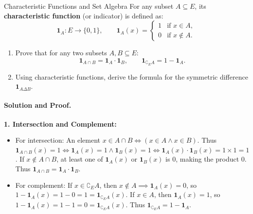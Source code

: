 \begin{workedexample}{Characteristic Functions and Set Algebra}
For any subset $A \subseteq E$, its \textbf{characteristic function} (or indicator) is defined as:
\[
\mathbf{1}_A : E \longrightarrow \{0, 1\}, \qquad \mathbf{1}_A(x) = \begin{cases} 1 & \text{if } x \in A, \\ 0 & \text{if } x \notin A. \end{cases}
\]
\begin{enumerate}[leftmargin=1.4em,itemsep=2pt]
  \item Prove that for any two subsets $A, B \subseteq E$:
  \[
  \mathbf{1}_{A \cap B} = \mathbf{1}_A \cdot \mathbf{1}_B, \qquad \mathbf{1}_{\complement_E A} = 1 - \mathbf{1}_A.
  \]
  \item Using characteristic functions, derive the formula for the symmetric difference $\mathbf{1}_{A \Delta B}$.
\end{enumerate}

\paragraph{Solution and Proof.}
\textbf{1. Intersection and Complement:}
\begin{itemize}[leftmargin=1.4em,itemsep=2pt]
  \item For intersection: An element $x \in A \cap B \iff (x \in A \land x \in B)$.
  Thus $\mathbf{1}_{A \cap B}(x) = 1 \iff \mathbf{1}_A(x) = 1 \land \mathbf{1}_B(x) = 1 \iff \mathbf{1}_A(x) \cdot \mathbf{1}_B(x) = 1 \times 1 = 1$.
  If $x \notin A \cap B$, at least one of $\mathbf{1}_A(x)$ or $\mathbf{1}_B(x)$ is $0$, making the product $0$.
  Thus $\mathbf{1}_{A \cap B} = \mathbf{1}_A \cdot \mathbf{1}_B$.
  \item For complement: If $x \in \complement_E A$, then $x \notin A \implies \mathbf{1}_A(x) = 0$, so $1 - \mathbf{1}_A(x) = 1 - 0 = 1 = \mathbf{1}_{\complement_E A}(x)$.
  If $x \in A$, then $\mathbf{1}_A(x) = 1$, so $1 - \mathbf{1}_A(x) = 1 - 1 = 0 = \mathbf{1}_{\complement_E A}(x)$.
  Thus $\mathbf{1}_{\complement_E A} = 1 - \mathbf{1}_A$.
\end{itemize}


\end{workedexample}
